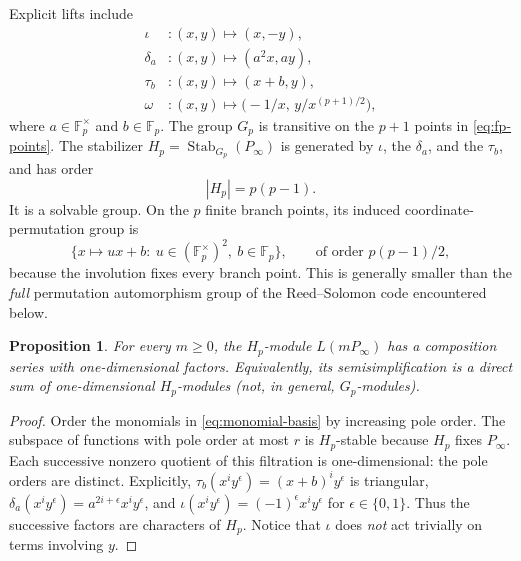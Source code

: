 \documentclass[12pt]{article}
\newtheorem{proposition}[theorem]{Proposition}
\numberwithin{equation}{section}
\newcommand{\F}{\mathbb{F}}
\newcommand{\Stab}{\operatorname{Stab}}
\begin{document}
Explicit lifts include
\begin{equation}\label{eq:generators}
\begin{aligned}
\iota &: (x,y)\mapsto(x,-y),\\
\delta_a &: (x,y)\mapsto(a^2x,ay),\\
\tau_b &: (x,y)\mapsto(x+b,y),\\
\omega &: (x,y)\mapsto
\bigl(-1/x,\,y/x^{(p+1)/2}\bigr),
\end{aligned}
\end{equation}
where $a\in\F_p^\times$ and $b\in\F_p$.
The group $G_p$ is transitive on the $p+1$ points in
\eqref{eq:fp-points}.  The stabilizer
$H_p=\Stab_{G_p}(P_\infty)$ is generated by
$\iota$, the $\delta_a$, and the $\tau_b$, and has order
\begin{equation}\label{eq:Hp-order}
|H_p|=p(p-1).
\end{equation}
It is a solvable group.  On the $p$ finite branch points,
its induced coordinate-permutation group is
\begin{equation}\label{eq:square-affine}
\{x\mapsto ux+b:\ u\in(\F_p^\times)^2,\ b\in\F_p\},
\qquad\text{of order }p(p-1)/2,
\end{equation}
because the involution fixes every branch point.  This is generally
smaller than the \emph{full} permutation automorphism group of the
Reed--Solomon code encountered below.

\begin{proposition}\label{prop:H-comp}
For every $m\geq0$, the $H_p$-module $L(mP_\infty)$ has a
composition series with one-dimensional factors.  Equivalently,
its semisimplification is a direct sum of one-dimensional
$H_p$-modules (not, in general, $G_p$-modules).
\end{proposition}
\begin{proof}
Order the monomials in \eqref{eq:monomial-basis} by increasing
pole order.  The subspace of functions with pole order at most
$r$ is $H_p$-stable because $H_p$ fixes $P_\infty$.
Each successive nonzero quotient of this filtration is
one-dimensional: the pole orders are distinct.  Explicitly,
$\tau_b(x^iy^\epsilon)=(x+b)^iy^\epsilon$ is triangular,
$\delta_a(x^iy^\epsilon)=a^{2i+\epsilon}x^iy^\epsilon$,
and $\iota(x^iy^\epsilon)=(-1)^\epsilon x^iy^\epsilon$
for $\epsilon\in\{0,1\}$.  Thus the successive factors are
characters of $H_p$.  Notice that $\iota$ does \emph{not}
act trivially on terms involving $y$.
\end{proof}
\end{document}
